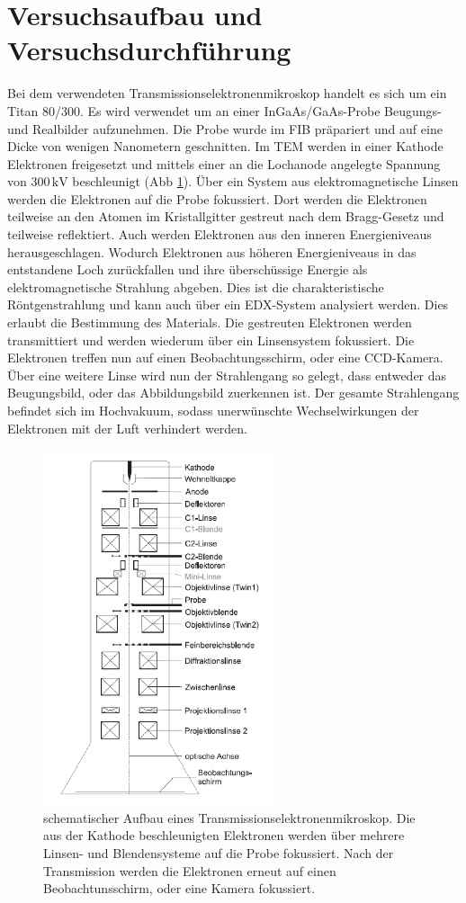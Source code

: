 \documentclass[a4paper,11pt,DIV=11]{scrartcl}
\begin{document}
\section{Versuchsaufbau und Versuchsdurchführung}
Bei dem verwendeten Transmissionselektronenmikroskop handelt es sich um ein Titan 80/300. Es wird verwendet um an einer InGaAs/GaAs-Probe Beugungs- und Realbilder aufzunehmen. Die Probe wurde im FIB präpariert und auf eine Dicke von wenigen Nanometern geschnitten. Im TEM werden in einer Kathode Elektronen freigesetzt und mittels einer an die Lochanode angelegte Spannung von \(300\,\mathrm{kV}\) beschleunigt (Abb \ref{TEM}). Über ein System aus elektromagnetische Linsen werden die Elektronen auf die Probe fokussiert. Dort werden die Elektronen teilweise an den Atomen im Kristallgitter gestreut nach dem Bragg-Gesetz und teilweise reflektiert. Auch werden Elektronen aus den inneren Energieniveaus herausgeschlagen. Wodurch Elektronen aus höheren Energieniveaus in das entstandene Loch zurückfallen und ihre überschüssige Energie als elektromagnetische Strahlung abgeben. Dies ist die charakteristische Röntgenstrahlung und kann auch über ein EDX-System analysiert werden. Dies erlaubt die Bestimmung des Materials.
Die gestreuten Elektronen werden transmittiert und werden wiederum über ein Linsensystem fokussiert. Die Elektronen treffen nun auf einen Beobachtungsschirm, oder eine CCD-Kamera. Über eine weitere Linse wird nun der Strahlengang so gelegt, dass entweder das Beugungsbild, oder das Abbildungsbild zuerkennen ist. Der gesamte Strahlengang befindet sich im Hochvakuum, sodass unerwünschte Wechselwirkungen der Elektronen mit der Luft verhindert werden.
\begin{figure}[H]
\center
\includegraphics[width=0.6\textwidth]{tem.png}
\caption{schematischer Aufbau eines Transmissionselektronenmikroskop. Die aus der Kathode beschleunigten Elektronen werden über mehrere Linsen- und Blendensysteme auf die Probe fokussiert. Nach der Transmission werden die Elektronen erneut auf einen Beobachtunsschirm, oder eine Kamera fokussiert.}
\label{TEM}
\end{figure}
\end{document}
